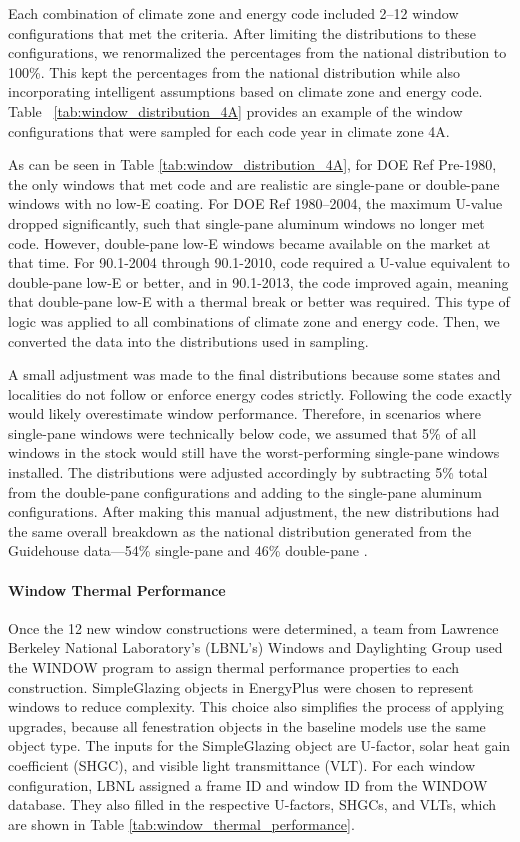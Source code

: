 Each combination of climate zone and energy code included 2--12 window configurations that met the criteria. After limiting the distributions to these configurations, we renormalized the percentages from the national distribution to 100\%. This kept the percentages from the national distribution while also incorporating intelligent assumptions based on climate zone and energy code. Table ~\ref{tab:window_distribution_4A} provides an example of the window configurations that were sampled for each code year in climate zone 4A.  



As can be seen in Table \ref{tab:window_distribution_4A}, for DOE Ref Pre-1980, the only windows that met code and are realistic are single-pane or double-pane windows with no low-E coating. For DOE Ref 1980--2004, the maximum U-value dropped significantly, such that single-pane aluminum windows no longer met code. However, double-pane low-E windows became available on the market at that time. For 90.1-2004 through 90.1-2010, code required a U-value equivalent to double-pane low-E or better, and in 90.1-2013, the code improved again, meaning that double-pane low-E with a thermal break or better was required. This type of logic was applied to all combinations of climate zone and energy code. Then, we converted the data into the distributions used in sampling.  

A small adjustment was made to the final distributions because some states and localities do not follow or enforce energy codes strictly. Following the code exactly would likely overestimate window performance. Therefore, in scenarios where single-pane windows were technically below code, we assumed that 5\% of all windows in the stock would still have the worst-performing single-pane windows installed. The distributions were adjusted accordingly by subtracting 5\% total from the double-pane configurations and adding to the single-pane aluminum configurations. After making this manual adjustment, the new distributions had the same overall breakdown as the national distribution generated from the Guidehouse data---54\% single-pane and 46\% double-pane . 

\paragraph{Window Thermal Performance}
Once the 12 new window constructions were determined, a team from Lawrence Berkeley National Laboratory's (LBNL’s) Windows and Daylighting Group used the WINDOW program to assign thermal performance properties to each construction. SimpleGlazing objects in EnergyPlus were chosen to represent windows to reduce complexity. This choice also simplifies the process of applying upgrades, because all fenestration objects in the baseline models use the same object type. The inputs for the SimpleGlazing object are U-factor, solar heat gain coefficient (SHGC), and visible light transmittance (VLT). For each window configuration, LBNL assigned a frame ID and window ID from the WINDOW database. They also filled in the respective U-factors, SHGCs, and VLTs, which are shown in Table \ref{tab:window_thermal_performance}.  

